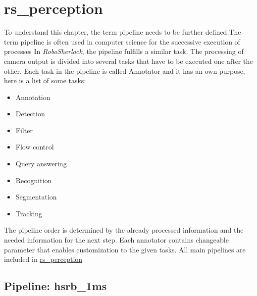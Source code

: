 \documentclass[main.tex]{subfiles}
\begin{document}
		\section{rs\_perception}\label{rs_perception}
To understand this chapter, the term pipeline needs to be further defined.The term pipeline is often used in computer science for the successive execution of processes
In \textit{RoboSherlock}, the pipeline fulfills a similar task. The processing of camera output is divided into several tasks that have to be executed one after the other.
Each task in the pipeline is called Annotator and it has an own purpose, here is a list of some tasks: 
		\begin{itemize}
			\item Annotation
			\item Detection
			\item Filter
			\item Flow control
			\item Query answering
			\item Recognition 
			\item Segmentation
			\item Tracking
		\end{itemize}		
The pipeline order is determined by the already processed information and the needed information for the next step.
Each annotator contains changeable parameter that enables customization to the given tasks. All main pipelines are included in \href{https://github.com/SUTURO/suturo_perception/tree/master/rs_perception}{rs\_perception}

			\subsection{Pipeline: hsrb\_1ms}
\end{document}
